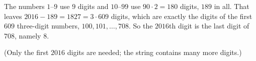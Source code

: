 The numbers $1$--$9$ use $9$ digits and $10$--$99$ use $90\cdot2=180$ digits, $189$ in all. That leaves $2016-189=1827=3\cdot609$ digits, which are exactly the digits of the first $609$ three-digit numbers, $100,101,\dots,708$. So the $2016$th digit is the last digit of $708$, namely $\boxed{8}$.

(Only the first $2016$ digits are needed; the string contains many more digits.)
